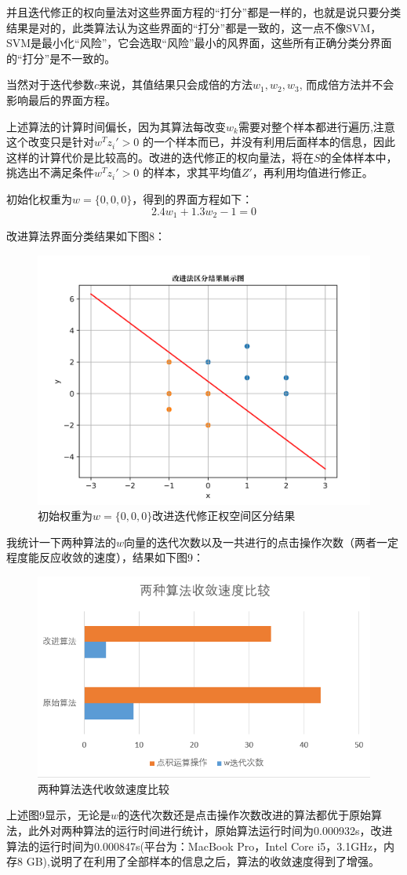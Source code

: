 \documentclass{article}
\newcommand{\hs}{\hspace{2em}}
\begin{document}
  \hs 并且迭代修正的权向量法对这些界面方程的“打分”都是一样的，也就是说只要分类结果是对的，此类算法认为这些界面的“打分”都是一致的，这一点不像SVM，SVM是最小化“风险”，它会选取“风险”最小的风界面，这些所有正确分类分界面的“打分”是不一致的。
  
  \hs 当然对于迭代参数$c$来说，其值结果只会成倍的方法$w_1,w_2,w_3$, 而成倍方法并不会影响最后的界面方程。\\
  
  
  {}
  
  \hs 上述算法的计算时间偏长，因为其算法每改变$w_k$需要对整个样本都进行遍历,注意这个改变只是针对$w^Tz_i '>0$ 的一个样本而已，并没有利用后面样本的信息，因此这样的计算代价是比较高的。改进的迭代修正的权向量法，将在$S$的全体样本中，挑选出不满足条件$w^Tz_i '>0$ 的样本，求其平均值$Z'$，再利用均值进行修正。
  
  \hs 初始化权重为$w=\{0,0,0\}$，得到的界面方程如下：
   \begin{equation*}
  2.4w_1+1.3w_2-1=0
  \end{equation*}
  
 \hs 改进算法界面分类结果如下图8：
    \begin{figure}[H]
 	\centering
 	\includegraphics[width=0.5\linewidth]{img//fig7.png}
 	\caption{初始权重为$w=\{0,0,0\}$改进迭代修正权空间区分结果}
 \end{figure}
  
  
  \hs 我统计一下两种算法的$w$向量的迭代次数以及一共进行的点击操作次数（两者一定程度能反应收敛的速度），结果如下图9：
    \begin{figure}[H]
  	\centering
  	\includegraphics[width=0.5\linewidth]{img//fig8.png}
  	\caption{两种算法迭代收敛速度比较}
  \end{figure}
  
  上述图9显示，无论是$w$的迭代次数还是点击操作次数改进的算法都优于原始算法，此外对两种算法的运行时间进行统计，原始算法运行时间为0.000932s，改进算法的运行时间为0.000847s(平台为：MacBook Pro，Intel Core i5，3.1GHz，内存8 GB),说明了在利用了全部样本的信息之后，算法的收敛速度得到了增强。
\end{document}
